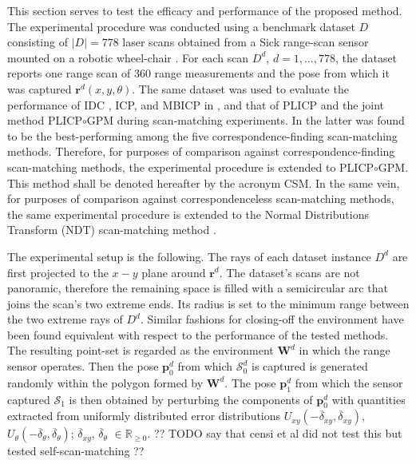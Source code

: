 This section serves to test the efficacy and performance of the proposed
method. The experimental procedure was conducted using a benchmark dataset $D$
consisting of $|D| = 778$ laser scans obtained from a Sick range-scan sensor
mounted on a robotic wheel-chair \cite{dataset_link}. For
each scan $D^d$, $d = 1,\dots,778$, the dataset reports one range scan of $360$
range measurements and the pose from which it was captured
$\bm{r}^d(x,y,\theta)$.  The same dataset was used to evaluate the performance
of IDC \cite{idc}, ICP, and MBICP in \cite{mbicp}, and that of PLICP and the
joint method PLICP$\circ$GPM during scan-matching experiments. In \cite{plicp}
the latter was found to be the best-performing among the five
correspondence-finding scan-matching methods. Therefore, for purposes of
comparison against correspondence-finding scan-matching methods, the
experimental procedure is extended to PLICP$\circ$GPM. This method shall be
denoted hereafter by the acronym CSM. In the same vein, for purposes of
comparison against correspondenceless scan-matching methods, the same
experimental procedure is extended to the Normal Distributions Transform (NDT)
scan-matching method \cite{ndt1}.

The experimental setup is the following. The rays of each dataset instance
$D^d$ are first projected to the $x-y$ plane around $\bm{r}^d$. The dataset's
scans are not panoramic, therefore the remaining space is filled with a
semicircular arc that joins the scan's two extreme ends. Its radius is set to
the minimum range between the two extreme rays of $D^d$. Similar fashions for
closing-off the environment have been found equivalent with respect to the
performance of the tested methods. The resulting point-set is regarded as the
environment $\bm{W}^d$ in which the range sensor operates.  Then the pose
$\bm{p}_0^d$ from which $\mathcal{S}_0^d$ is captured is generated randomly
within the polygon formed by $\bm{W}^d$. The pose $\bm{p}_1^d$ from which the
sensor captured $\mathcal{S}_1$ is then obtained by perturbing the components
of $\bm{p}_0^d$ with quantities extracted from uniformly distributed error
distributions $U_{xy}(-\overline{\delta}_{xy}, \overline{\delta}_{xy})$,
$U_{\theta}(-\overline{\delta}_{\theta}, \overline{\delta}_{\theta})$;
$\overline{\delta}_{xy}$, $\overline{\delta}_\theta$ $\in \mathbb{R}_{\geq 0}$.
?? TODO say that censi et al did not test this but tested self-scan-matching ??


